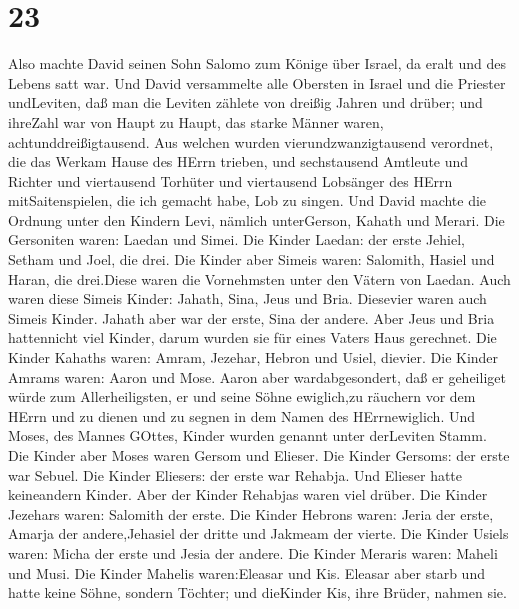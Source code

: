 \hypertarget{section-22}{%
\section{23}\label{section-22}}

 Also machte David seinen Sohn Salomo zum Könige über
Israel, da eralt und des Lebens satt war.  Und David
versammelte alle Obersten in Israel und die Priester undLeviten,
 daß man die Leviten zählete von dreißig Jahren und drüber;
und ihreZahl war von Haupt zu Haupt, das starke Männer waren,
achtunddreißigtausend.  Aus welchen wurden
vierundzwanzigtausend verordnet, die das Werkam Hause des HErrn trieben,
und sechstausend Amtleute und Richter  und viertausend
Torhüter und viertausend Lobsänger des HErrn mitSaitenspielen, die ich
gemacht habe, Lob zu singen.  Und David machte die Ordnung
unter den Kindern Levi, nämlich unterGerson, Kahath und Merari.
 Die Gersoniten waren: Laedan und Simei.  Die
Kinder Laedan: der erste Jehiel, Setham und Joel, die drei. 
Die Kinder aber Simeis waren: Salomith, Hasiel und Haran, die drei.Diese
waren die Vornehmsten unter den Vätern von Laedan.  Auch
waren diese Simeis Kinder: Jahath, Sina, Jeus und Bria. Diesevier waren
auch Simeis Kinder.  Jahath aber war der erste, Sina der
andere. Aber Jeus und Bria hattennicht viel Kinder, darum wurden sie für
eines Vaters Haus gerechnet.  Die Kinder Kahaths waren:
Amram, Jezehar, Hebron und Usiel, dievier.  Die Kinder
Amrams waren: Aaron und Mose. Aaron aber wardabgesondert, daß er
geheiliget würde zum Allerheiligsten, er und seine Söhne ewiglich,zu
räuchern vor dem HErrn und zu dienen und zu segnen in dem Namen des
HErrnewiglich.  Und Moses, des Mannes GOttes, Kinder wurden
genannt unter derLeviten Stamm.  Die Kinder aber Moses
waren Gersom und Elieser.  Die Kinder Gersoms: der erste
war Sebuel.  Die Kinder Eliesers: der erste war Rehabja.
Und Elieser hatte keineandern Kinder. Aber der Kinder Rehabjas waren
viel drüber.  Die Kinder Jezehars waren: Salomith der
erste.  Die Kinder Hebrons waren: Jeria der erste, Amarja
der andere,Jehasiel der dritte und Jakmeam der vierte.  Die
Kinder Usiels waren: Micha der erste und Jesia der andere. 
Die Kinder Meraris waren: Maheli und Musi. Die Kinder Mahelis
waren:Eleasar und Kis.  Eleasar aber starb und hatte keine
Söhne, sondern Töchter; und dieKinder Kis, ihre Brüder, nahmen sie.
